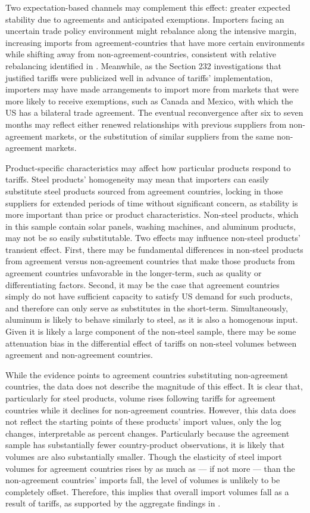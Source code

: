 Two expectation-based channels may complement this effect: greater expected stability due to agreements and anticipated exemptions. Importers facing an uncertain trade policy environment might rebalance along the intensive margin, increasing imports from agreement-countries that have more certain environments while shifting away from non-agreement-countries, consistent with relative rebalancing identified in \textcite{carballo2022}. Meanwhile, as the Section 232 investigations that justified tariffs were publicized well in advance of tariffs' implementation, importers may have made arrangements to import more from markets that were more likely to receive exemptions, such as Canada and Mexico, with which the US has a bilateral trade agreement. The eventual reconvergence after six to seven months may reflect either renewed relationships with previous suppliers from non-agreement markets, or the substitution of similar suppliers from the same non-agreement markets. 

Product-specific characteristics may affect how particular products respond to tariffs. Steel products' homogeneity may mean that importers can easily substitute steel products sourced from agreement countries, locking in those suppliers for extended periods of time without significant concern, as stability is more important than price or product characteristics. Non-steel products, which in this sample contain solar panels, washing machines, and aluminum products, may not be so easily substitutable. Two effects may influence non-steel products' transient effect. First, there may be fundamental differences in non-steel products from agreement versus non-agreement countries that make those products from agreement countries unfavorable in the longer-term, such as quality or differentiating factors. Second, it may be the case that agreement countries simply do not have sufficient capacity to satisfy US demand for such products, and therefore can only serve as substitutes in the short-term. Simultaneously, aluminum is likely to behave similarly to steel, as it is also a homogenous input. Given it is likely a large component of the non-steel sample, there may be some attenuation bias in the differential effect of tariffs on non-steel volumes between agreement and non-agreement countries. 

While the evidence points to agreement countries substituting non-agreement countries, the data does not describe the magnitude of this effect. It is clear that, particularly for steel products, volume rises following tariffs for agreement countries while it declines for non-agreement countries. However, this data does not reflect the starting points of these products' import values, only the log changes, interpretable as percent changes. Particularly because the agreement sample has substantially fewer country-product observations, it is likely that volumes are also substantially smaller. Though the elasticity of steel import volumes for agreement countries rises by as much as --- if not more --- than the non-agreement countries' imports fall, the level of volumes is unlikely to be completely offset. Therefore, this implies that overall import volumes fall as a result of tariffs, as supported by the aggregate findings in \textcite{amiti_whos_2020}. 

